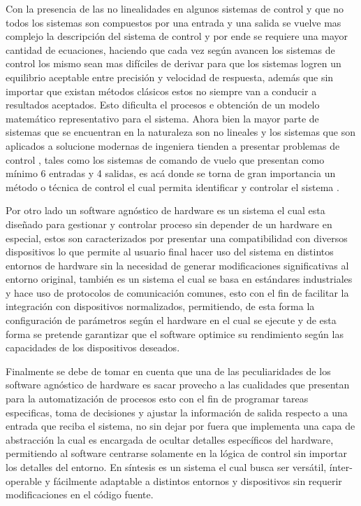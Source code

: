 \documentclass[12pt]{article}
\begin{document}
Con la presencia de las no linealidades en algunos sistemas de control y que no todos los sistemas son compuestos por una entrada y una salida se vuelve mas complejo la descripción del sistema  de control y por ende se requiere una mayor cantidad de ecuaciones, haciendo que cada vez según avancen los sistemas de control los mismo sean mas difíciles de derivar para que los sistemas logren un equilibrio aceptable entre precisión y velocidad de respuesta, además que sin importar que existan métodos clásicos estos no siempre van a conducir a resultados aceptados. Esto dificulta el procesos e obtención de un modelo matemático representativo para el sistema. Ahora bien la mayor parte de sistemas que se encuentran en la naturaleza son no lineales y los sistemas que son aplicados a solucione modernas de ingeniera tienden a presentar problemas de control , tales como los sistemas de comando de vuelo que presentan como mínimo 6 entradas y 4 salidas, es acá donde se torna de gran importancia un método o técnica de control el cual permita identificar y controlar el sistema \cite{15-tec}. 


Por otro lado un software agnóstico de hardware es un sistema el cual esta diseñado para gestionar y controlar proceso sin depender de un hardware en especial, estos son caracterizados por presentar una compatibilidad con diversos dispositivos lo que permite al usuario final hacer uso del sistema en distintos entornos de hardware sin la necesidad de generar modificaciones significativas al entorno original, también es un sistema el cual se basa en estándares industriales y hace uso de protocolos de comunicación comunes, esto con el fin de facilitar la integración con dispositivos normalizados, permitiendo, de esta forma la configuración de parámetros según el hardware en el cual se ejecute y de esta forma se pretende garantizar que el software optimice su rendimiento según las capacidades de los dispositivos deseados\cite{krainiuk2021oneapi}. 

Finalmente se debe de tomar en cuenta que una de las peculiaridades de los software agnóstico de hardware es sacar provecho a las cualidades que presentan para la automatización de procesos esto con el fin de programar tareas especificas, toma de decisiones y ajustar la información de salida respecto a una entrada que reciba el sistema, no sin dejar por fuera que implementa una capa de abstracción la cual es encargada de ocultar detalles específicos del hardware, permitiendo al software centrarse solamente en la lógica de control sin importar los detalles del entorno. En síntesis es un sistema el cual busca ser versátil, ínter-operable y fácilmente adaptable a distintos entornos y dispositivos sin requerir modificaciones en el código fuente.
\end{document}
